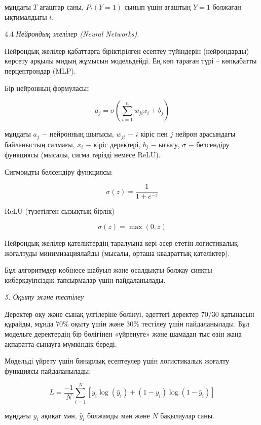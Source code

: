 мұндағы \(T\) ағаштар саны, \(P_{t}(Y = 1)\) сынып үшін ағаштың
\(Y = 1\) болжаған ықтималдығы \(t\).

4.4 \emph{Нейрондық желілер (Neural Networks).}

Нейрондық желілер қабаттарға біріктірілген есептеу түйіндерін
(нейрондарды) көрсету арқылы мидың жұмысын модельдейді. Ең көп тараған
түрі -- көпқабатты перцептрондар (MLP).

Бір нейронның формуласы{\bfseries :}

\begin{equation}
a_{j} = \sigma\left( \sum_{i = 1}^{n}{w_{ji}x_{i} + b_{j}} \right)
\end{equation}

мұндағы \(a_{j}\) − нейронның шығысы, \(w_{ji}\) − \(i\) кіріс пен \(j\)
нейрон арасындағы байланыстың салмағы, \(x_{i}\) − кіріс деректері,
\(b_{j}\) − ығысу, \(\sigma\) − белсендіру функциясы (мысалы, сигма
тәрізді немесе ReLU).

Сигмоидты белсендіру функциясы:

\begin{equation}
\sigma(z) = \frac{1}{1 + e^{- z}}
\end{equation}

ReLU (түзетілген сызықтық бірлік)

\begin{equation}
\sigma(z) = \max(0,z)
\end{equation}

Нейрондық желілер қателіктердің таралуына кері әсер ететін логистикалық
жоғалтуды минимизациялайды (мысалы, орташа квадраттық қателіктер).

Бұл алгоритмдер көбінесе шабуыл және осалдықты болжау сияқты
киберқауіпсіздік тапсырмалар үшін пайдаланылады.

\emph{5. Оқыту және тестілеу}

Деректер оқу және сынақ үлгілеріне бөлінуі, әдеттегі деректер 70/30
қатынасын құрайды, мұнда 70\% оқыту үшін және 30\% тестілеу үшін
пайдаланылады. Бұл модельге деректердің бір бөлігінен «үйренуге» және
шамадан тыс өзін жаңа ақпаратта сынауға мүмкіндік береді.

Модельді үйрету үшін бинарлық есептеулер үшін логистикалық жоғалту
функциясы пайдаланылады:

\[L = \frac{- 1}{N}\sum_{i = 1}^{N}\left\lbrack y_{i}\log\left( {\hat{y}}_{i} \right) + (1 - y_{i})\log(1 - {\hat{y}}_{i}) \right\rbrack\]

мұндағы \(y_{i}\) ақиқат мән, \({\hat{y}}_{i}\) болжамды мән және \(N\)
бақылаулар саны.


